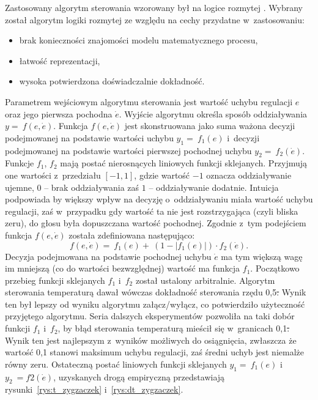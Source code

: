 Zastosowany algorytm sterowania wzorowany był na logice rozmytej \cite{FuzzyLogic} \cite{Piegat}. Wybrany został
algorytm logiki rozmytej ze względu na cechy przydatne w~zastosowaniu:
\begin{itemize}
	\item brak konieczności znajomości modelu matematycznego procesu,
	\item łatwość reprezentacji,
	\item wysoka potwierdzona doświadczalnie dokładność.
\end{itemize}

Parametrem wejściowym algorytmu sterowania jest wartość uchybu regulacji $e$
oraz jego pierwsza pochodna $\dot{e}$. Wyjście algorytmu określa sposób oddziaływania
$y =~f(e,\dot{e})$. 
Funkcja $f(e,\dot{e})$ jest skonstruowana jako suma ważona decyzji podejmowanej na
podstawie wartości uchybu $y_1 =~f_1(e)$ i~decyzji podejmowanej na podstawie
wartości pierwszej pochodnej uchybu $y_2 =~f_2(\dot{e})$. Funkcje $f_1$, $f_2$ mają
postać nierosnących liniowych funkcji sklejanych. Przyjmują one wartości
z~przedziału $[-1, 1]$, gdzie wartość $-1$ oznacza oddziaływanie ujemne, $0$ -- brak
oddziaływania zaś $1$ -- oddziaływanie dodatnie.
Intuicja podpowiada by większy wpływ na decyzję o~oddziaływaniu miała wartość
uchybu regulacji, zaś w~przypadku gdy wartość ta nie jest rozstrzygająca (czyli
bliska zeru), do głosu była dopuszczana wartość pochodnej. Zgodnie z~tym
podejściem funkcja $f(e,\dot{e})$ została zdefiniowana następująco:
\begin{equation}
f(e,\dot{e}) =~f_1(e) +~(1-|f_1(e)|) \cdot f_2(\dot{e}).
\end{equation}
Decyzja podejmowana na podstawie pochodnej uchybu $\dot{e}$ ma tym większą wagę im
mniejszą (co do wartości bezwzględnej) wartość ma funkcja $f_1$. Początkowo
przebieg funkcji sklejanych $f_1$ i~$f_2$ został ustalony arbitralnie. Algorytm
sterowania temperaturą dawał wówczas dokładność sterowania rzędu 0,5\st. Wynik
ten był lepszy od wyniku algorytmu załącz/wyłącz, co potwierdziło użyteczność
przyjętego algorytmu. Seria dalszych eksperymentów pozwoliła na taki dobór
funkcji $f_1$ i~$f_2$, by błąd sterowania temperaturą mieścił się w~granicach
0,1\st. Wynik ten jest najlepszym z~wyników możliwych do osiągnięcia, zwłaszcza że wartość
0,1 stanowi maksimum uchybu regulacji, zaś średni uchyb jest niemalże równy
zeru. Ostateczną postać liniowych funkcji sklejanych $y_1 =~f_1(e)$
i~$y_2~=f2(\dot{e})$, uzyskanych drogą empiryczną przedstawiają
rysunki~\ref{rys:t_zygzaczek} i~\ref{rys:dt_zygzaczek}.

